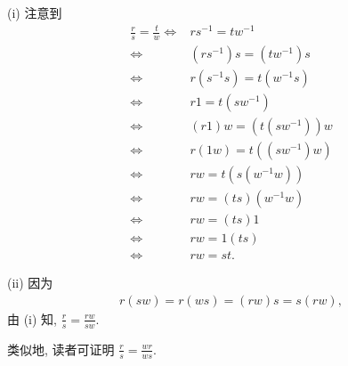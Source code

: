 \begin{pf}
    (i) 注意到
    \begin{align*}
        \frac{r}{s} = \frac{t}{w}
        \iff {} & rs^{-1} = tw^{-1}         \\
        \iff {} & (rs^{-1}) s = (tw^{-1}) s \\
        \iff {} & r(s^{-1} s) = t(w^{-1} s) \\
        \iff {} & r1 = t(sw^{-1})           \\
        \iff {} & (r1)w = (t(sw^{-1}))w     \\
        \iff {} & r(1w) = t((sw^{-1})w)     \\
        \iff {} & rw = t(s(w^{-1}w))        \\
        \iff {} & rw = (ts)(w^{-1}w)        \\
        \iff {} & rw = (ts)1                \\
        \iff {} & rw = 1(ts)                \\
        \iff {} & rw = st.
    \end{align*}

    (ii) 因为
    \begin{align*}
        r(sw) = r(ws) = (rw)s = s(rw),
    \end{align*}
    由 (i) 知, $\frac{r}{s} = \frac{rw}{sw}$.

    类似地, 读者可证明 $\frac{r}{s} = \frac{wr}{ws}$.


\end{pf}
